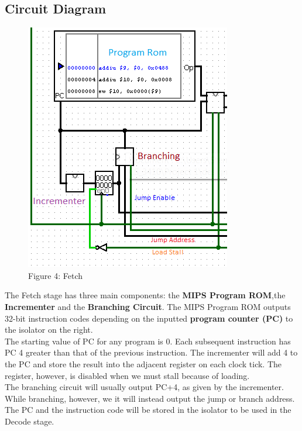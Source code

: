 \documentclass{article}
\begin{document}
\subsection{Circuit Diagram}
\begin{figure}
\vspace{-1.7cm}
\begin{center}
\includegraphics[scale=0.8]{Fetch.png} \\
Figure 4: Fetch
\end{center}
\vspace{-1.2cm}
\end{figure}
The Fetch stage has three main components: the \textbf{MIPS Program ROM},the \textbf{Incrementer} and the \textbf{Branching Circuit}. The MIPS Program ROM outputs 32-bit instruction codes depending on the inputted \textbf{program counter (PC)} to the isolator on the right. \\
The starting value of PC for any program is 0. Each subsequent instruction has PC 4 greater than that of the previous instruction. The incrementer will add 4 to the PC and store the result into the adjacent register on each clock tick. The register, however, is disabled when we must stall because of loading. \\
The branching circuit will usually output PC+4, as given by the incrementer. While branching, however, we it will instead output the jump or branch address. \\
The PC and the instruction code will be stored in the isolator to be used in the Decode stage. \\
\end{document}
